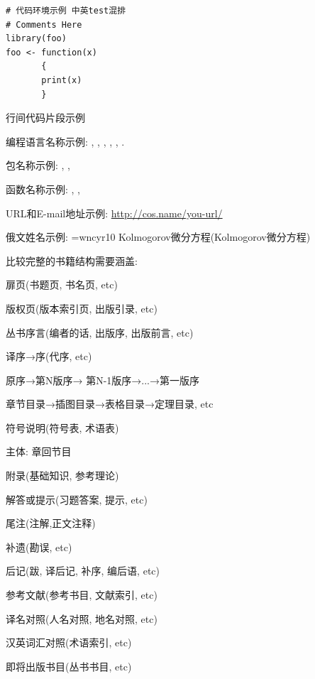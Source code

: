 \documentclass{cosbook}
\begin{document}
\begin{Verbatim}
# 代码环境示例 中英test混排
# Comments Here
library(foo)
foo <- function(x)
       {
       print(x)
       }
\end{Verbatim}

行间代码片段示例

编程语言名称示例:
\R , , , , , .

包名称示例:
, , 

函数名称示例:
, , 

URL和E-mail地址示例: \url{http://cos.name/you-url/} 

俄文姓名示例: \font\fontWCA=wncyr10 {\fontWCA Kolmogorov}微分方程(Kolmogorov微分方程)

比较完整的书籍结构需要涵盖:

扉页(书题页, 书名页, etc)

版权页(版本索引页, 出版引录, etc)

丛书序言(编者的话, 出版序, 出版前言, etc)

译序→序(代序, etc)

原序→第N版序→ 第N-1版序→...→第一版序

章节目录→插图目录→表格目录→定理目录, etc

符号说明(符号表, 术语表)



主体: 章回节目



附录(基础知识, 参考理论)

解答或提示(习题答案, 提示, etc)

尾注(注解,正文注释)

补遗(勘误, etc)

后记(跋, 译后记, 补序, 编后语, etc)

参考文献(参考书目, 文献索引, etc)

译名对照(人名对照, 地名对照, etc)

汉英词汇对照(术语索引, etc)

即将出版书目(丛书书目, etc)
\end{document}

